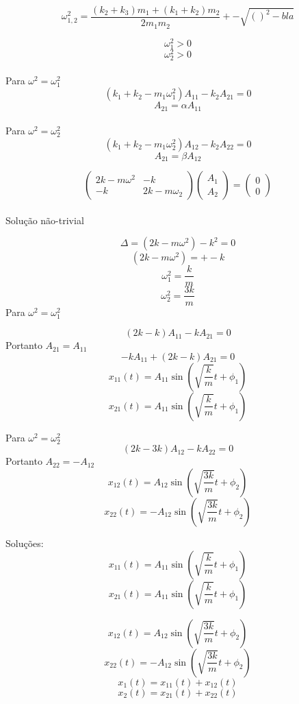 \[\omega_{1,2}^{2}=\frac{(k_{2}+k_{3})m_{1}+(k_{1}+k_{2})m_{2}}{2m_{1}m_{2}}+- \sqrt{()^{2}- bla}\]

\[\omega_{1}^{2}>0\]
\[\omega_{2}^{2}>0\]
\\
Para $\omega^{2}=\omega_{1}^{2}$
\[(k_{1}+k_{2}-m_{1}\omega_{1}^{2})A_{11}-k_{2}A_{21}=0\]
\[A_{21}=\alpha A_{11}\]
\\
Para $\omega^{2}=\omega_{2}^{2}$
\[(k_{1}+k_{2}-m_{1}\omega_{2}^{2})A_{12}-k_{2}A_{22}=0\]
\[A_{21}=\beta A_{12}\]

\[
\begin{pmatrix}
2k-m\omega^{2} & -k \\ 
-k & 2k-m\omega_{2}
\end{pmatrix} \begin{pmatrix}
A_{1} \\ 
A_{2}
\end{pmatrix}=\begin{pmatrix}
0 \\ 
0
\end{pmatrix} 
\]
\\
Solução não-trivial

\[\Delta=(2k-m\omega^{2})-k^{2}=0\]
\[(2k-m\omega^{2})=+-k\]
\[\omega_{1}^{2}=\frac{k}{m}\]
\[\omega_{2}^{2}=\frac{3k}{m}\]
Para $\omega^{2}=\omega_{1}^{2}$

\[(2k-k)A_{11}-kA_{21}=0\]
Portanto $A_{21}=A_{11}$
\[-kA_{11}+(2k-k)A_{21}=0\]
\[x_{11}(t)=A_{11}\sin(\sqrt{\frac{k}{m}}t+\phi _{1})\]
\[x_{21}(t)=A_{11}\sin(\sqrt{\frac{k}{m}}t+\phi _{1})\]

Para $\omega^{2}=\omega_{2}^{2}$
\[(2k-3k)A_{12}-kA_{22}=0\]
Portanto $A_{22}=-A_{12}$
\[x_{12}(t)=A_{12}\sin(\sqrt{\frac{3k}{m}}t+\phi _{2})\]
\[x_{22}(t)=-A_{12}\sin(\sqrt{\frac{3k}{m}}t+\phi _{2})\]



Soluções:
\[x_{11}(t)=A_{11}\sin(\sqrt{\frac{k}{m}} t + \phi _{1})\]
\[x_{21}(t)= A_{11}\sin(\sqrt{\frac{k}{m}} t + \phi _{1})\]

\[x_{12}(t)=A_{12}\sin(\sqrt{\frac{3k}{m}} t + \phi _{2})\]
\[x_{22}(t)=- A_{12}\sin(\sqrt{\frac{3k}{m}} t + \phi _{2})\]
\[x_{1}(t)=x_{11}(t)+x_{12}(t)\]
\[x_{2}(t)=x_{21}(t)+x_{22}(t)\]

